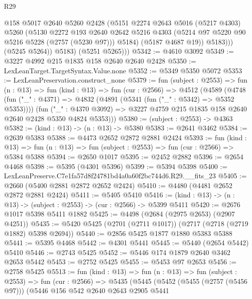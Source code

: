 \begin{lexlean}{R29}
\begin{coremodule}
                  @158
                  @5017
                  @2640
                  @5260
                  @2428
                  (@5151
                    @2274
                    @2643
                    @5016
                    (@5217 @4303)
                    @5260
                    (@5130
                      @2272
                      @193
                      @2640
                      @2642
                      @5216
                      @4303
                      (@5214 @97 @5220 @90 @5216 @5228 (@2757 (@5230 @97)))
                      @5184)
                    (@5187 @4687 @19))
                  @5183)))
            (@5245 @5264))
          @5183)
        (@5251 @5265)))
@5342 := @4610 @3092
@5349 := @3227 @4992 @215 @1835 @158 @2640 @2640 @2428
@5350 := LexLeanTarget.TargetSyntax.Value.none
@5352 := @5349 @5350 @5072
@5353 := LexLeanPreservation.construct_none
@5379 := fun (subject : @2553) =>
  fun (n : @13) =>
  fun (kind : @13) =>
  fun (cur : @2566) =>
  @4512
    (@4589
      (@4748
        (fun ("_" : @4371) => @4832 (@4891 (@5341 (fun ("_" : @5342) => @5352 @5353))))
        (fun ("_" : @4370 @3092) =>
        @3227 @4759 @215 @1835 @158 @2640 @2640 @2428 @5350 @4824 @5353)))
@5380 := (subject : @2553) -> @4363
@5382 := (kind : @13) -> (n : @13) -> @5380
@5383 := @2641 @3462
@5384 := @2639 @5383
@5388 := @4473 @2652 @2872 @2881 @2424
@5393 := fun (kind : @13) =>
  fun (n : @13) => fun (subject : @2553) => fun (cur : @2566) => @5384 @5388
@5394 := @2650 @1017
@5395 := @2452 @2882
@5396 := @2654 @4468
@5398 := @5395 (@4301 @5396)
@5399 := @5394 @5398
@5400 := LexLeanPreserve.C7e1fa57d8f24781bd4a0a60f2bc744d6.R29.__fits_23
@5405 := @2660 (@5400 @2881 @2872 @2652 @2424)
@5410 := @4480 (@4481 @2652 @2872 @2881 @2424)
@5411 := @5405 @5410
@5416 := (kind : @13) -> (n : @13) -> (subject : @2553) -> (cur : @2566) -> @5399 @5411
@5420 := @2676 @1017 @5398 @5411 @1882
@5425 := @4498 (@2684 (@2975 @2653) (@2907 @4251))
@5435 := @5420 @5425 (@2701 (@2711 @1017)) (@2717 (@2718 (@2719 @1882) @5398 @2694))
@5440 := @2856 @5425 @1877 @1880 @5383 @5388
@5441 := @5395 @4468
@5442 := @4301 @5441
@5445 := @5440 (@2654 @5442) @5410
@5446 := @2743 @5425
@5452 := @5446 @174 @1879 @2640 @3462 @2653 @5442
@5453 := @2752 @5425
@5455 := @5453 @97 @2653
@5456 := @2758 @5425
@5513 := fun (kind : @13) =>
  fun (n : @13) =>
  fun (subject : @2553) =>
  fun (cur : @2566) =>
  @5435
    (@5445
      (@5452
        (@5455 (@2757 (@5456 @97)))
        (@5446
          @156
          @542
          @2640
          @2643
          @2905
          @5441

\end{coremodule}
\end{lexlean}
